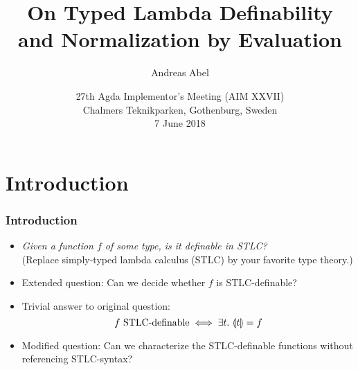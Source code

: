 \documentclass[t,fleqn,usenames,dvipsnames]{beamer}
\title[Typed Lambda Definability]{%
On Typed Lambda Definability \\ and Normalization by Evaluation}
\author[Abel]{
  Andreas Abel\inst{1}
}
\institute[] %
{
  \inst{1}
  Department of Computer Science and Engineering\\
  Chalmers and Gothenburg University, Sweden \\[1ex]
}
\date[AIM XXVII 2018] %
{ 27th Agda Implementor's Meeting (AIM XXVII) \\
  Chalmers Teknikparken, Gothenburg, Sweden \\
  7 June 2018
}
\newcommand{\cAnn}{\color{red!80!black}}%
\renewcommand{\emph}[1]{{\cAnn#1}}
\newcommand{\cType}{\color{orange!60!black}}
\renewcommand{\emph}[1]{\textit{\cType#1}}
\begin{document}
\maketitle


%
%
%
%




\section{Introduction}


\begin{frame}%
  \frametitle{Introduction}
  \begin{itemize}
  \item \emph{Given a function $f$ of some type, is it definable in STLC?} \\
   (Replace simply-typed lambda calculus (STLC) by your favorite
    type theory.)
  \item Extended question: Can we decide whether $f$ is STLC-definable?
  \item Trivial answer to original question:
\[
  f \mbox{ STLC-definable} \iff \exists t.\ \llparenthesis t\rrparenthesis = f
\]
\vspace{-2ex}
  \item Modified question: Can we characterize the STLC-definable
    functions without referencing STLC-syntax?
  \end{itemize}
\end{frame}
\end{document}
